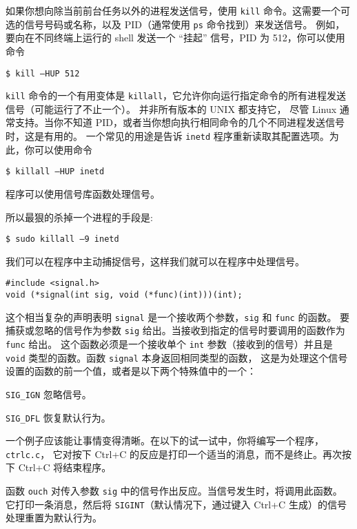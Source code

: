 \documentclass{ctexart}
\begin{document}
如果你想向除当前前台任务以外的进程发送信号，使用 \texttt{kill} 命令。这需要一个可选的信号号码或名称，以及 PID（通常使用 \texttt{ps} 命令找到）来发送信号。
例如，要向在不同终端上运行的 shell 发送一个 ``挂起'' 信号，PID 为 512，你可以使用命令  
  
\begin{verbatim}  
$ kill –HUP 512  
\end{verbatim}  
  
\texttt{kill} 命令的一个有用变体是 \texttt{killall}，它允许你向运行指定命令的所有进程发送信号（可能运行了不止一个）。
并非所有版本的 UNIX 都支持它，
尽管 Linux 通常支持。当你不知道 PID，或者当你想向执行相同命令的几个不同进程发送信号时，这是有用的。
一个常见的用途是告诉 \texttt{inetd} 程序重新读取其配置选项。为此，你可以使用命令  
  
\begin{verbatim}  
$ killall –HUP inetd  
\end{verbatim}  
  
程序可以使用信号库函数处理信号。  

所以最狠的杀掉一个进程的手段是:
\begin{verbatim}  
$ sudo killall –9 inetd  
\end{verbatim}  

我们可以在程序中主动捕捉信号，这样我们就可以在程序中处理信号。

\begin{verbatim}  
#include <signal.h>  
void (*signal(int sig, void (*func)(int)))(int);  
\end{verbatim}  

这个相当复杂的声明表明 \texttt{signal} 是一个接收两个参数，\texttt{sig} 和 \texttt{func} 的函数。
要捕获或忽略的信号作为参数 \texttt{sig} 给出。当接收到指定的信号时要调用的函数作为 \texttt{func} 给出。
这个函数必须是一个接收单个 \texttt{int} 参数（接收到的信号）并且是 \texttt{void} 类型的函数。函数 \texttt{signal} 本身返回相同类型的函数，
这是为处理这个信号设置的函数的前一个值，或者是以下两个特殊值中的一个：  
  
\verb|SIG_IGN| 忽略信号。  
  
\verb|SIG_DFL| 恢复默认行为。  
  
一个例子应该能让事情变得清晰。在以下的试一试中，你将编写一个程序，\texttt{ctrlc.c}，
它对按下 Ctrl+C 的反应是打印一个适当的消息，而不是终止。再次按下 Ctrl+C 将结束程序。
  
函数 \texttt{ouch} 对传入参数 \texttt{sig} 中的信号作出反应。当信号发生时，将调用此函数。
它打印一条消息，然后将 \texttt{SIGINT}（默认情况下，通过键入 Ctrl+C 生成）的信号处理重置为默认行为。  
  
\end{document}
